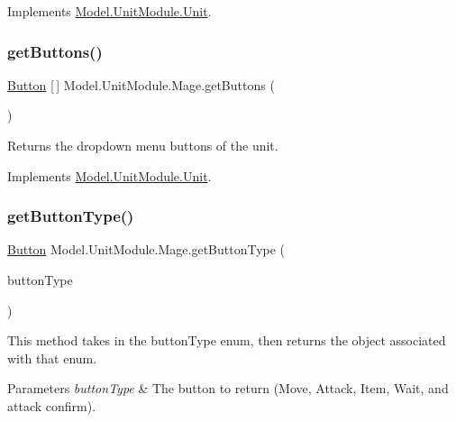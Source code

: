 Implements \hyperlink{interface_model_1_1_unit_module_1_1_unit_ac8e47a3f8d13fe8a719f962a3ee9ee46}{Model.\+Unit\+Module.\+Unit}.

\hypertarget{class_model_1_1_unit_module_1_1_mage_a830affe9a902833c691f89d103b50d31}{}\label{class_model_1_1_unit_module_1_1_mage_a830affe9a902833c691f89d103b50d31} 
\subsubsection{\texorpdfstring{get\+Buttons()}{getButtons()}}
{\footnotesize\ttfamily \hyperlink{class_model_1_1_button}{Button} \mbox{[}$\,$\mbox{]} Model.\+Unit\+Module.\+Mage.\+get\+Buttons (\begin{DoxyParamCaption}{ }\end{DoxyParamCaption})\hspace{0.3cm}{\ttfamily [inline]}}

Returns the dropdown menu buttons of the unit. 

Implements \hyperlink{interface_model_1_1_unit_module_1_1_unit_a5256d2141e9c59e0454e47ac65246bda}{Model.\+Unit\+Module.\+Unit}.

\hypertarget{class_model_1_1_unit_module_1_1_mage_a996253aeeb97c7a5d64ad81c03adf0f0}{}\label{class_model_1_1_unit_module_1_1_mage_a996253aeeb97c7a5d64ad81c03adf0f0} 
\subsubsection{\texorpdfstring{get\+Button\+Type()}{getButtonType()}}
{\footnotesize\ttfamily \hyperlink{class_model_1_1_button}{Button} Model.\+Unit\+Module.\+Mage.\+get\+Button\+Type (\begin{DoxyParamCaption}\item[{\hyperlink{namespace_model_ac76b3489c9d704f49912608bd36cd0e7}{Button\+Type}}]{button\+Type }\end{DoxyParamCaption})\hspace{0.3cm}{\ttfamily [inline]}}

This method takes in the button\+Type enum, then returns the object associated with that enum. 
\begin{DoxyParams}{Parameters}
{\em button\+Type} & The button to return (Move, Attack, Item, Wait, and attack confirm). \\
\hline
\end{DoxyParams}


